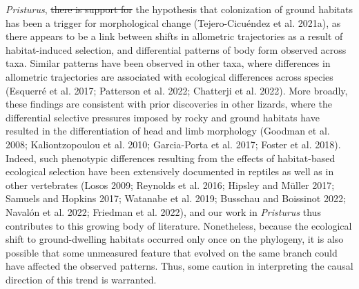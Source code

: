 \documentclass[
  11pt,
]{article}
\providecommand{\DIFaddtex}[1]{{\protect\color{blue}\uwave{#1}}} %
\providecommand{\DIFdeltex}[1]{{\protect\color{red}\sout{#1}}}                      %
\providecommand{\DIFaddbegin}{} %
\providecommand{\DIFaddend}{} %
\providecommand{\DIFdelbegin}{} %
\providecommand{\DIFdelend}{} %
\providecommand{\DIFadd}[1]{\texorpdfstring{\DIFaddtex{#1}}{#1}} %
\providecommand{\DIFdel}[1]{\texorpdfstring{\DIFdeltex{#1}}{}} %
\newcommand{\DIFscaledelfig}{0.5}
\newlength{\DIFdelgraphicswidth} %
\newlength{\DIFdelgraphicsheight} %
\newcommand{\DIFaddincludegraphics}[2][]{{\color{blue}\fbox{\DIFOincludegraphics[#1]{#2}}}} %
\newcommand{\DIFdelincludegraphics}[2][]{%
\sbox{\DIFdelgraphicsbox}{\DIFOincludegraphics[#1]{#2}}%
\settoboxwidth{\DIFdelgraphicswidth}{\DIFdelgraphicsbox} %
\settoboxtotalheight{\DIFdelgraphicsheight}{\DIFdelgraphicsbox} %
\scalebox{\DIFscaledelfig}{%
\parbox[b]{\DIFdelgraphicswidth}{\usebox{\DIFdelgraphicsbox}\\[-\baselineskip] \rule{\DIFdelgraphicswidth}{0em}}\llap{\resizebox{\DIFdelgraphicswidth}{\DIFdelgraphicsheight}{%
\setlength{\unitlength}{\DIFdelgraphicswidth}%
\begin{picture}(1,1)%
\thicklines\linethickness{2pt} %
{\color[rgb]{1,0,0}\put(0,0){\framebox(1,1){}}}%
{\color[rgb]{1,0,0}\put(0,0){\line( 1,1){1}}}%
{\color[rgb]{1,0,0}\put(0,1){\line(1,-1){1}}}%
\end{picture}%
}\hspace*{3pt}}} %
} %
\DeclareRobustCommand{\DIFaddbegin}{\DIFOaddbegin \let\includegraphics\DIFaddincludegraphics} %
\DeclareRobustCommand{\DIFaddend}{\DIFOaddend \let\includegraphics\DIFOincludegraphics} %
\DeclareRobustCommand{\DIFdelbegin}{\DIFOdelbegin \let\includegraphics\DIFdelincludegraphics} %
\DeclareRobustCommand{\DIFdelend}{\DIFOaddend \let\includegraphics\DIFOincludegraphics} %
\begin{document}
\emph{Pristurus}, \DIFdelbegin \DIFdel{there is support for }\DIFdelend \DIFaddbegin \DIFadd{our results are consistent with }\DIFaddend the hypothesis that
colonization of ground habitats has been a trigger for morphological
change (Tejero-Cicuéndez et al. 2021a), as there appears to be a link
between shifts in allometric trajectories as a result of habitat-induced
selection, and differential patterns of body form observed across taxa.
Similar patterns have been observed in other taxa, where differences in
allometric trajectories are associated with ecological differences
across species (Esquerré et al. 2017; Patterson et al. 2022; Chatterji
et al. 2022). More broadly, these findings are consistent with prior
discoveries in other lizards, where the differential selective pressures
imposed by rocky and ground habitats have resulted in the
differentiation of head and limb morphology (Goodman et al. 2008;
Kaliontzopoulou et al. 2010; Garcia-Porta et al. 2017; Foster et al.
2018). Indeed, such phenotypic differences resulting from the effects of
habitat-based ecological selection have been extensively documented in
reptiles as well as in other vertebrates (Losos 2009; Reynolds et al.
2016; Hipsley and Müller 2017; Samuels and Hopkins 2017; Watanabe et al.
2019; Busschau and Boissinot 2022; Navalón et al. 2022; Friedman et al.
2022), and our work in \emph{Pristurus} thus contributes to this growing
body of literature. Nonetheless, because the ecological shift to
ground-dwelling habitats occurred only once on the phylogeny, it is also
possible that some unmeasured feature that evolved on the same branch
could have affected the observed patterns. Thus, some caution in
interpreting the causal direction of this trend is warranted.
\hfill\break
\end{document}
